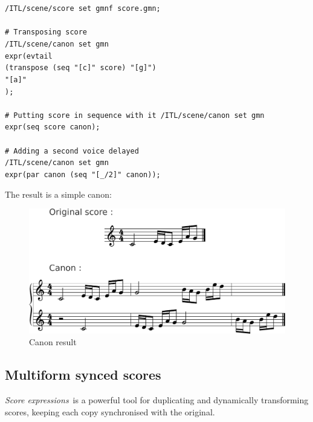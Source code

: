 \documentclass{article}
\newcommand{\SExpr}{\emph{Score expressions}}
\newcommand{\tab}{\hspace*{4mm}}
\newcommand{\sample}	[1]			{\vspace{-0.2em}\begin{center}\colorbox{mygrey}{\begin{minipage}[t]{0.95\columnwidth} {\small \texttt{#1}}\end{minipage}}\end{center}}
\begin{document}
{\sample{/ITL/scene/score set gmnf score.gmn;\\
\\
\# Transposing score\\
/ITL/scene/canon set gmn\\
\tab expr(evtail\\
\tab\tab(transpose (seq "[c]" score) "[g]")\\
\tab\tab"[a]"\\
\tab);\\
\\
\# Putting score in sequence with it
/ITL/scene/canon set gmn\\
\tab expr(seq score canon);\\
\\
\# Adding a second voice delayed\\
/ITL/scene/canon set gmn\\
\tab expr(par canon (seq "[\_/2]" canon));
}

The result is a simple canon:
\begin{figure}[th]
\centering
\includegraphics[width=1.\columnwidth]{imgs/exampleCanon}
\caption{Canon result
\label{fig:canonFig}}
\end{figure}

\subsection{Multiform synced scores}\label{sample2}
\SExpr\ is a powerful tool for duplicating and dynamically transforming scores, keeping each copy synchronised with the original.

}
\end{document}
